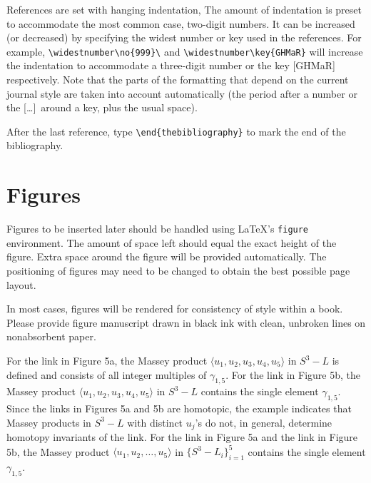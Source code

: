References are set with hanging indentation, The amount of indentation
is preset to accommodate the most common case, two-digit numbers.
It can be increased (or decreased) by specifying the widest number or
key used in the references. For example,
\verb+\widestnumber\no{999}\+ and
\verb+\widestnumber\key{GHMaR}+
will increase the indentation to accommodate a three-digit number or the key
\hbox{[GHMaR]} respectively.  Note that the parts of the formatting that
depend on the current journal style are taken into account automatically
(the period after a number or the [\dots]\ around a key, plus the usual
space).

After the last reference, type \verb+\end{thebibliography}+ to mark the end of
the bibliography.

\section{Figures}

Figures to be inserted later should be handled using \LaTeX's \verb+figure+
environment.  The amount of space left should equal the exact height of the
figure.  Extra space around the figure will be provided automatically.  The
positioning of figures may need to be changed to obtain the best possible page
layout.  

In most cases, figures will be rendered for consistency of style within a
book.  Please provide figure manuscript drawn in black ink with clean,
unbroken lines on nonabsorbent paper.

For the link in Figure 5a, the Massey product $\langle u_1, u_2, u_3,
u_4, u_5\rangle$ in $S^3-L$ is defined and consists of all
integer multiples of $\gamma_{1,5}$.  For the link in Figure 5b,
the Massey product $\langle u_1, u_2, u_3, u_4, u_5\rangle$ in
$S^3-L$ contains the single element $\gamma_{1,5}$.  Since the links
in Figures 5a and 5b are homotopic, the example indicates that Massey
products in $S^3-L$ with distinct $u_j$'s do not, in general,
determine homotopy invariants of the link.  For the link in Figure 5a
and the link in Figure 5b, the Massey product $\langle u_1, u_2, \dots,
u_5\rangle$ in $\{S^3-L_i\}_{i=1}^5$ contains the single element
$\gamma_{1,5}$.


\begin{figure}
\vskip 11.5pc
\caption{}
\end{figure}

